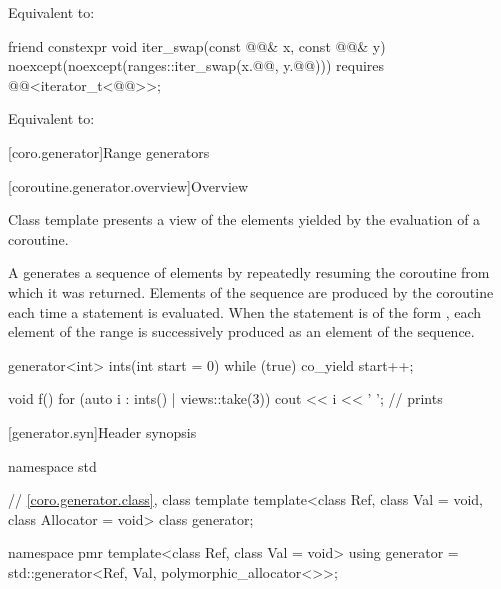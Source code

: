 \begin{itemdescr}
\pnum
\effects
Equivalent to: 
\end{itemdescr}

%
\begin{itemdecl}
friend constexpr void iter_swap(const @@& x, const @@& y)
  noexcept(noexcept(ranges::iter_swap(x.@@, y.@@)))
  requires @@<iterator_t<@@>>;
\end{itemdecl}

\begin{itemdescr}
\pnum
\effects
Equivalent to: 
\end{itemdescr}

[coro.generator]{Range generators}

[coroutine.generator.overview]{Overview}

\pnum
Class template  presents
a view of the elements yielded by the evaluation of a coroutine.

\pnum
A  generates a sequence of elements by
repeatedly resuming the coroutine from which it was returned.
Elements of the sequence are produced by the coroutine
each time a  statement is evaluated.
When the  statement is of the form
,
each element of the range 
is successively produced as an element of the sequence.
\begin{example}
\begin{codeblock}
generator<int> ints(int start = 0) {
  while (true)
    co_yield start++;
}

void f() {
  for (auto i : ints() | views::take(3))
    cout << i << ' ';       // prints 
}
\end{codeblock}
\end{example}

[generator.syn]{Header  synopsis}

%
\begin{codeblock}
namespace std {
  // \ref{coro.generator.class}, class template 
  template<class Ref, class Val = void, class Allocator = void>
    class generator;

  namespace pmr {
    template<class Ref, class Val = void>
      using generator = std::generator<Ref, Val, polymorphic_allocator<>>;
  }
}
\end{codeblock}

